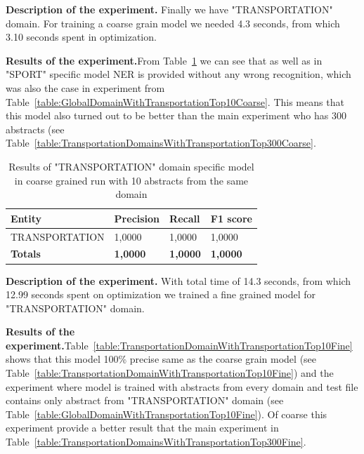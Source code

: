 \documentclass[thesis=M,english]{FITthesis}[2018/05/30]
\begin{document}
	\textbf{Description of the experiment.} Finally we have "TRANSPORTATION" domain. For training a coarse grain model we needed 4.3 seconds, from which 3.10 seconds spent in optimization. 
	
	\textbf{Results of the experiment.}From Table~\ref{table:TransportationDomainWithTransportationTop10Coarse} we can see that as well as in "SPORT" specific model NER is provided without any wrong recognition, which was also the case in experiment from Table~\ref{table:GlobalDomainWithTransportationTop10Coarse}. This means that this model also turned out to be better than the main experiment who has 300 abstracts (see Table~\ref{table:TransportationDomainsWithTransportationTop300Coarse}.
	
	\begin{table}[H]\centering
		\begin{tabular}{|l|l|l|l|}
			\hline {\textbf{Entity}} & {\textbf{Precision}} & {\textbf{Recall}} & {\textbf{F1 score}}\\\hline
				TRANSPORTATION & 1,0000 & 1,0000 & 1,0000\\\hline
				\textbf{Totals} & \textbf{1,0000} & \textbf{1,0000} & \textbf{1,0000}\\\hline
		\end{tabular}
		\caption{Results of "TRANSPORTATION" domain specific model in coarse grained run with 10 abstracts from the same domain \label{table:TransportationDomainWithTransportationTop10Coarse}}
	\end{table}

	\textbf{Description of the experiment.} With total time of 14.3 seconds, from which 12.99 seconds spent on optimization we trained a fine grained model for "TRANSPORTATION" domain. 
	
	\textbf{Results of the experiment.}Table~\ref{table:TransportationDomainWithTransportationTop10Fine} shows that this model 100\% precise same as the coarse grain model (see Table~\ref{table:TransportationDomainWithTransportationTop10Fine}) and the experiment where model is trained with abstracts from every domain and test file contains only abstract from "TRANSPORTATION" domain (see Table~\ref{table:GlobalDomainWithTransportationTop10Fine}). Of coarse this experiment provide a better result that the main experiment in Table~\ref{table:TransportationDomainsWithTransportationTop300Fine}.   
   
\end{document}
